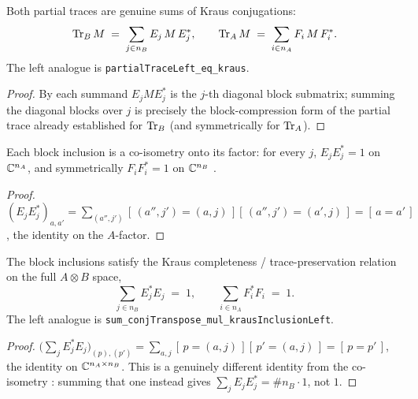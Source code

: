 \begin{theorem}\label{partialTraceRight_eq_kraus}
  \leanok
  Both partial traces are genuine sums of Kraus conjugations:
  \[
    \operatorname{Tr}_B M \;=\; \sum_{j\in n_B} E_j\,M\,E_j^{*},
    \qquad
    \operatorname{Tr}_A M \;=\; \sum_{i\in n_A} F_i\,M\,F_i^{*}.
  \]
  The left analogue is \texttt{partialTraceLeft\_eq\_kraus}.
\end{theorem}
\begin{proof}\leanok
  By  each summand \(E_j M E_j^{*}\) is the \(j\)-th diagonal block
  submatrix; summing the diagonal blocks over \(j\) is precisely the block-compression form of the
  partial trace already established for \(\operatorname{Tr}_B\) (and symmetrically for \(\operatorname{Tr}_A\)).
\end{proof}

\begin{lemma}\label{krausInclusionRight_mul_conjTranspose}
  \leanok
  Each block inclusion is a co-isometry onto its factor: for every \(j\),
  \(E_j E_j^{*} = 1\) on \(\mathbb{C}^{n_A}\), and symmetrically \(F_i F_i^{*} = 1\) on \(\mathbb{C}^{n_B}\)
  .
\end{lemma}
\begin{proof}\leanok
  \((E_j E_j^{*})_{a,a'} = \sum_{(a'',j')}[\,(a'',j') = (a,j)\,][\,(a'',j') = (a',j)\,]
  = [\,a = a'\,]\), the identity on the \(A\)-factor.
\end{proof}

\begin{lemma}\label{sum_conjTranspose_mul_krausInclusionRight}
  \leanok
  The block inclusions satisfy the Kraus completeness / trace-preservation relation on the full
  \(A\otimes B\) space,
  \[
    \sum_{j\in n_B} E_j^{*}E_j \;=\; 1,
    \qquad
    \sum_{i\in n_A} F_i^{*}F_i \;=\; 1.
  \]
  The left analogue is \texttt{sum\_conjTranspose\_mul\_krausInclusionLeft}.
\end{lemma}
\begin{proof}\leanok
  \(\bigl(\sum_j E_j^{*}E_j\bigr)_{(p),(p')} = \sum_{a,j}[\,p = (a,j)\,][\,p' = (a,j)\,]
  = [\,p = p'\,]\), the identity on \(\mathbb{C}^{n_A\times n_B}\). This is a genuinely different identity
  from the co-isometry : summing that one instead gives
  \(\sum_j E_j E_j^{*} = \#n_B\cdot 1\), not \(1\).
\end{proof}

